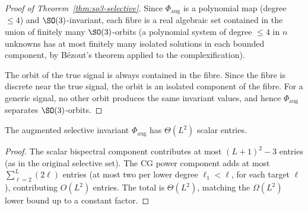 \begin{proof}[Proof of Theorem~\ref{thm:so3-selective}]
Since $\Phi_{\mathrm{aug}}$ is a polynomial map (degree $\le 4$) and
$\SO(3)$-invariant, each fibre is a real algebraic set contained in
the union of finitely many $\SO(3)$-orbits (a polynomial system of
degree $\le 4$ in $n$ unknowns has at most finitely many isolated
solutions in each bounded component, by B\'ezout's theorem applied
to the complexification).

The orbit of the true signal is always contained in the fibre.
Since the fibre is discrete near the true signal, the orbit is
an isolated component of the fibre. For a generic signal, no other
orbit produces the same invariant values, and hence $\Phi_{\mathrm{aug}}$
separates $\SO(3)$-orbits.
\end{proof}



\begin{proposition}
\label{prop:augmented-size}
The augmented selective invariant $\Phi_{\mathrm{aug}}$ has
$\Theta(L^2)$ scalar entries.
\end{proposition}
\begin{proof}
The scalar bispectral component contributes at most
$(L{+}1)^2 - 3$ entries (as in the original selective set).
The CG power component adds at most $\sum_{\ell=2}^{L} (2\ell)$
entries (at most two per lower degree $\ell_1 < \ell$, for each
target $\ell$), contributing $O(L^2)$ entries.
The total is $\Theta(L^2)$, matching the
$\Omega(L^2)$ lower bound up to a constant factor.
\end{proof}
